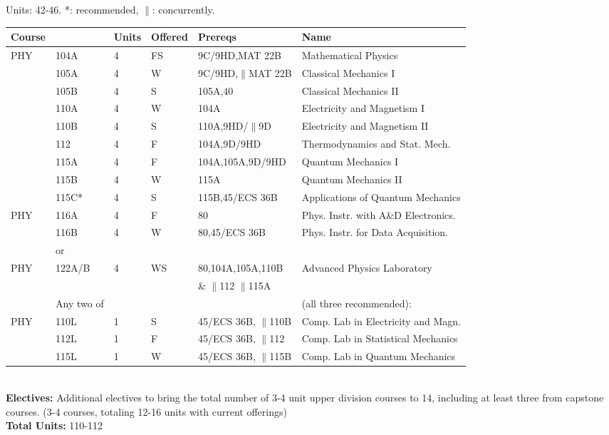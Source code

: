 \documentclass[12pt]{article}
\begin{document}
\newpage
{}
\noindent
\vskip 0.25cm
Units:  42-46. *: recommended, $\parallel$: concurrently.\\
\begin{tabular}{|llllll|}
\hline
Course & & Units & Offered & Prereqs & Name \\
\hline
PHY & 104A & 4 & FS & 9C/9HD,MAT 22B   & Mathematical Physics \\ 
    & 105A & 4 & W & 9C/9HD,$\parallel$MAT 22B & Classical Mechanics I\\
    & 105B & 4 & S & 105A,40          & Classical Mechanics II\\ 
    & 110A & 4 & W & 104A             & Electricity and Magnetism I\\
    & 110B & 4 & S & 110A,9HD/$\parallel$9D    & Electricity and Magnetism II\\
    & 112  & 4 & F & 104A,9D/9HD      & Thermodynamics and Stat. Mech.\\    
    & 115A & 4 & F & 104A,105A,9D/9HD & Quantum Mechanics I \\
    & 115B & 4 & W & 115A             & Quantum Mechanics II \\
    & 115C* & 4 & S & 115B,45/ECS 36B& Applications of Quantum Mechanics\\ 
\hline
\hline
PHY & 116A & 4 &  F & 80              & Phys. Instr. with A\&D Electronics.  \\
    & 116B & 4 &  W & 80,45/ECS 36B   & Phys. Instr. for Data Acquisition. \\ 
\hline
    & or & & & & \\
\hline
PHY & 122A/B & 4 & WS & 80,104A,105A,110B & Advanced Physics Laboratory \\  
    &  & & & \& $\parallel$112 $\parallel$115A&  \\  

\hline
\hline
 & Any two of & & & & (all three recommended): \\
\hline 
PHY & 110L & 1 & S & 45/ECS 36B, $\parallel$110B & Comp. Lab in Electricity and Magn. \\
    & 112L & 1 & F & 45/ECS 36B, $\parallel$112  & Comp. Lab in Statistical Mechanics \\ 
    & 115L & 1 & W & 45/ECS 36B, $\parallel$115B & Comp. Lab in Quantum Mechanics \\ 
\hline
\end{tabular}\\ \vskip 0.25cm
\noindent
{\bf Electives:} Additional electives to bring the total number of 3-4 unit upper division courses to 14, including at least three from capstone courses.  
(3-4 courses, totaling 12-16 units with current offerings)
\\
\noindent
{\bf Total Units:} 110-112
\end{document}
